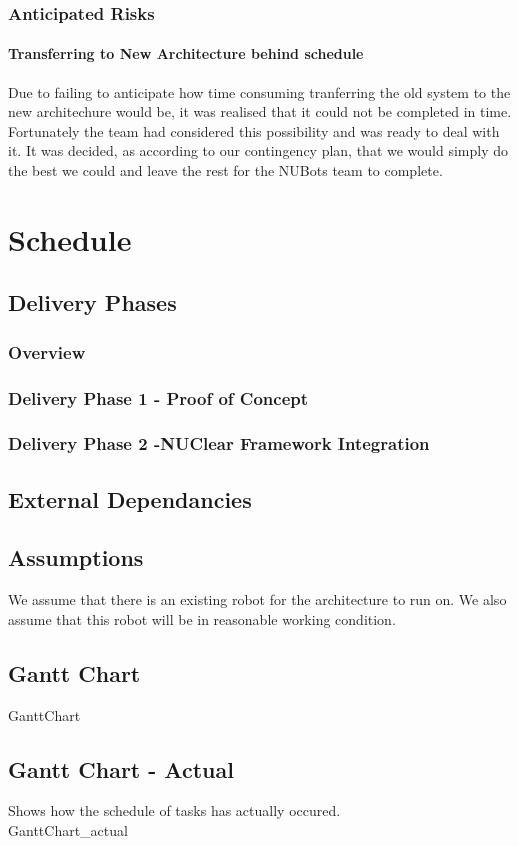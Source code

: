 \documentclass[a4paper]{article}
\begin{document}
			\subsubsection{Anticipated Risks}
				\paragraph{Transferring to New Architecture behind schedule}  
					Due to failing to anticipate how time consuming tranferring the old system to the new architechure would be, it was realised that it could not be completed in time. Fortunately the team had considered this possibility and was ready to deal with it. It was decided, as according to our contingency plan, that we would simply do the best we could and leave the rest for the NUBots team to complete.
	\section{Schedule}
		\subsection{Delivery Phases}
			\subsubsection{Overview}
			\subsubsection{Delivery Phase 1 - Proof of Concept}			
			\subsubsection{Delivery Phase 2 -NUClear Framework Integration}
		\subsection{External Dependancies}
		\subsection{Assumptions}
			We assume that there is an existing robot for the architecture to run on. We also assume that this robot will be in reasonable working condition.
		\subsection{Gantt Chart}
			{GanttChart}
		\subsection{Gantt Chart - Actual}
			Shows how the schedule of tasks has actually occured. \\
			{GanttChart_actual}
\end{document}
